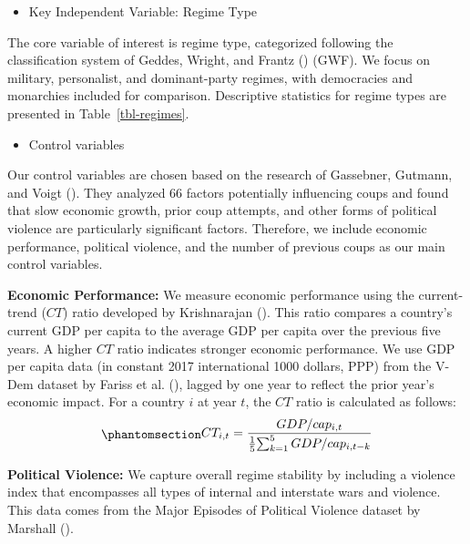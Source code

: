 \documentclass[
  12pt,
]{report}
\providecommand{\tightlist}{%
  \setlength{\itemsep}{0pt}\setlength{\parskip}{0pt}}\usepackage{longtable,booktabs,array}
\begin{document}
\begin{itemize}
\tightlist
\item
  Key Independent Variable: Regime Type
\end{itemize}

The core variable of interest is regime type, categorized following the
classification system of Geddes, Wright, and Frantz
() (GWF). We focus on military,
personalist, and dominant-party regimes, with democracies and monarchies
included for comparison. Descriptive statistics for regime types are
presented in Table~\ref{tbl-regimes}.

\begin{itemize}
\tightlist
\item
  Control variables
\end{itemize}

Our control variables are chosen based on the research of Gassebner,
Gutmann, and Voigt (). They analyzed
66 factors potentially influencing coups and found that slow economic
growth, prior coup attempts, and other forms of political violence are
particularly significant factors. Therefore, we include economic
performance, political violence, and the number of previous coups as our
main control variables.

\textbf{Economic Performance:} We measure economic performance using the
current-trend (\(CT\)) ratio developed by Krishnarajan
(). This ratio compares a country's
current GDP per capita to the average GDP per capita over the previous
five years. A higher \(CT\) ratio indicates stronger economic
performance. We use GDP per capita data (in constant 2017 international
1000 dollars, PPP) from the V-Dem dataset by Fariss et al.
(), lagged by one year to reflect the
prior year's economic impact. For a country \(i\) at year \(t\), the
\(CT\) ratio is calculated as follows:
\begin{equation}\phantomsection\label{eq-eq6}{
\begin{aligned}
CT_{i,t} = {GDP/cap_{i,t} \over {1 \over 5} {\sum_{k=1}^5GDP/cap_{i,t-k}}}
\end{aligned}
}\end{equation}

\textbf{Political Violence:} We capture overall regime stability by
including a violence index that encompasses all types of internal and
interstate wars and violence. This data comes from the Major Episodes of
Political Violence dataset by Marshall
().
\end{document}
